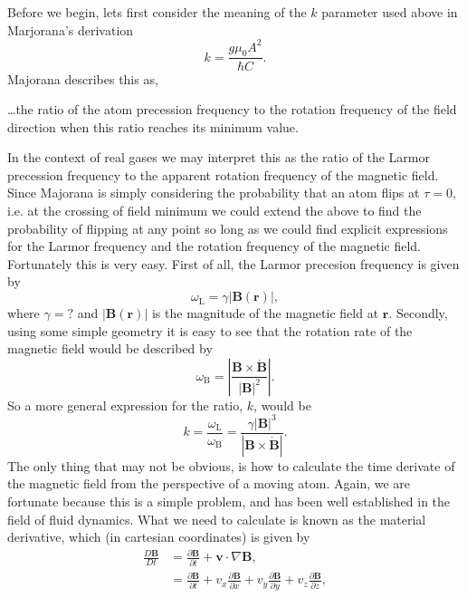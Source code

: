 Before we begin, lets first consider the meaning of the $k$ parameter used above in Marjorana's derivation
\begin{equation}
    k = \frac{g \mu_{0} A^2} {\hbar C}.
\end{equation}
Majorana describes this as, 
\begin{displayquote}
    \dots the ratio of the atom precession frequency to the rotation frequency of the field direction when this ratio reaches its minimum value.
\end{displayquote}
In the context of real gases we may interpret this as the ratio of the Larmor precession frequency to the apparent rotation frequency of the magnetic field.
Since Majorana is simply considering the probability that an atom flips at $\tau = 0$, i.e. at the crossing of field minimum we could extend the above to find the probability of flipping at any point so long as we could find explicit expressions for the Larmor frequency and the rotation frequency of the magnetic field.
Fortunately this is very easy.
First of all, the Larmor precesion frequency is given by
\begin{equation}
    \omega_{\textrm{L}} = \gamma \vert \mathbf{B}(\mathbf{r}) \vert,
\end{equation}
where $\gamma = ?$ and $\vert \mathbf{B}(\mathbf{r}) \vert$ is the magnitude of the magnetic field at $\mathbf{r}$.
Secondly, using some simple geometry it is easy to see that the rotation rate of the magnetic field would be described by
\begin{equation}
    \omega_\mathrm{B} = \left \vert \frac{\mathbf{B} \times \dot{ \mathbf{B} } } { \left \vert \mathbf{B} \right \vert ^ 2} \right \vert.
\end{equation}
So a more general expression for the ratio, $k$, would be
\begin{equation}
    k = \frac{\omega_\textrm{L}}{\omega_\textrm{B}} = \frac{\gamma \left\vert \mathbf{B} \right\vert^3}{\left\vert \mathbf{B} \times \dot{ \mathbf{B} }\right \vert }.
\end{equation}
The only thing that may not be obvious, is how to calculate the time derivate of the magnetic field from the perspective of a moving atom.
Again, we are fortunate because this is a simple problem, and has been well established in the field of fluid dynamics.
What we need to calculate is known as the material derivative, which (in cartesian coordinates) is given by
\begin{align}
    \frac{D \mathbf{B}}{Dt} &= \frac{\partial \mathbf{B}}{\partial t} + \mathbf{v} \cdot \nabla \mathbf{B},\\
    &= \frac{\partial \mathbf{B}}{\partial t} + v_x  \frac{\partial \mathbf{B}}{\partial x} + v_y \frac{\partial \mathbf{B}}{\partial y} + v_z \frac{\partial \mathbf{B}}{\partial z},
\end{align}
